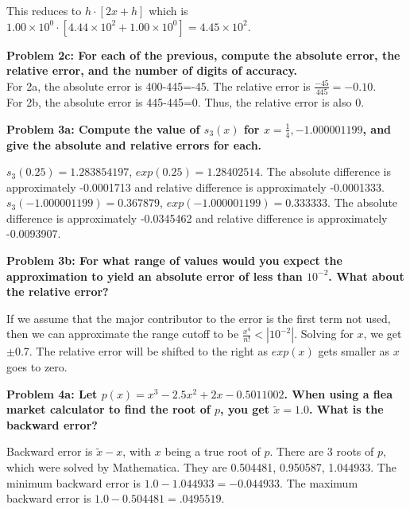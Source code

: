 \documentclass[11pt]{article}
\numberwithin{equation}{section}  %
\begin{document}
\noindent This reduces to $h \cdot [2x + h]$ which is $1.00 \times 10^0 \cdot [4.44 \times 10^2 + 1.00 \times 10^0] = 4.45 \times 10^2$.

\vspace*{0.25in}

\noindent\textbf{Problem 2c: For each of the previous, compute the absolute error, the relative error, and the number of digits of accuracy.}\\
\noindent For 2a, the absolute error is 400-445=-45. The relative error is $\frac{-45}{445}=-0.10$.\\
For 2b, the absolute error is 445-445=0. Thus, the relative error is also 0.

\vspace*{0.25in}

\noindent\textbf{Problem 3a: Compute the value of $s_3(x)$ for $x=\frac{1}{4},-1.000001199$, and give the absolute and relative errors for each.}

\noindent $s_3(0.25) = 1.283854197$, $exp(0.25)=1.28402514$. The absolute difference is approximately -0.0001713 and relative difference is approximately -0.0001333.\\
$s_3(-1.000001199) = 0.367879$, $exp(-1.000001199)=0.333333$. The absolute difference is approximately -0.0345462 and relative difference is approximately -0.0093907.
\vspace*{0.25in}

\noindent\textbf{Problem 3b: For what range of values would you expect the approximation to yield an absolute error of less than $10^{-2}$. What about the relative error?}

\noindent If we assume that the major contributor to the error is the first term not used, then we can approximate the range cutoff to be $\frac{x^4}{n!} < |10^{-2}|$. Solving for $x$, we get $\pm$0.7. The relative error will be shifted to the right as $exp(x)$ gets smaller as $x$ goes to zero.  
\vspace*{0.25in}

\noindent\textbf{Problem 4a: Let $p(x) = x^3 - 2.5x^2 + 2x-0.5011002$. When using a flea market calculator to find the root of $p$, you get $\tilde{x}=1.0$. What is the backward error?}

\noindent Backward error is $\tilde{x} - x$, with $x$ being a true root of $p$. There are 3 roots of $p$, which were solved by Mathematica. They are 0.504481, 0.950587, 1.044933. The minimum backward error is $1.0 - 1.044933=-0.044933$. The maximum backward error is $1.0-0.504481=.0495519$.
\vspace*{0.25in}
\end{document}
